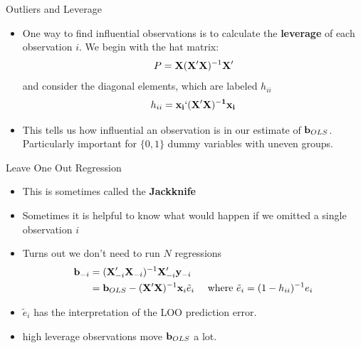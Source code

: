 \begin{frame}{Outliers and Leverage}
\begin{itemize}
\item One way to find influential observations is to calculate the {\bf leverage} of each observation $i$. We begin with the hat matrix:
\begin{align*}
P = {\bf X} ({\bf X} '{\bf X})^{-1}  {\bf X}'
\end{align*}
and consider the diagonal elements, which are labeled $h_{ii}$
\begin{align*}
h_{ii} = \bf{x}_i `({\bf X} '{\bf X})^{-1}  \bf{x}_i
\end{align*}

\medskip
\item This tells us how influential an observation is in our estimate of ${\bf b}_{OLS}$.\\
Particularly important for $\{0,1\}$ dummy variables with uneven groups.
\end{itemize}
\end{frame}



\begin{frame}{Leave One Out Regression}
\begin{itemize}
\item This is sometimes called the {\bf Jackknife}
\item Sometimes it is helpful to know what would happen if we omitted a single observation $i$
\item Turns out we don't need to run $N$ regressions
\begin{align*}
{\bf b}_{-i} &= ({\bf X}_{-i}'{\bf X}_{-i})^{-1} {\bf X}_{-i}' {\bf y}_{-i} \\
&={\bf b}_{OLS} -  ({\bf X} '{\bf X})^{-1} {\bf x}_i  \tilde{e}_i  \quad \mbox{ where } \tilde{e}_i = (1-h_{ii})^{-1} e_i
\end{align*}
\item $\tilde{e}_i $ has the interpretation of the LOO prediction error.
\item high leverage observations move ${\bf b}_{OLS}$ a lot.
\end{itemize}
\end{frame}



